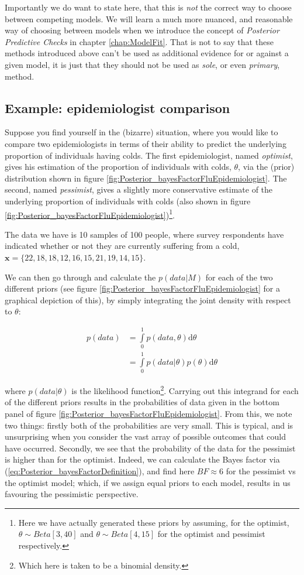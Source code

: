\documentclass[11pt,fullpage]{book}
\begin{document}
Importantly we do want to state here, that this is \textit{not} the correct way to choose between competing models. We will learn a much more nuanced, and reasonable way of choosing between models when we introduce the concept of \textit{Posterior Predictive Checks} in chapter \ref{chap:ModelFit}. That is not to say that these methods introduced above can't be used as additional evidence for or against a given model, it is just that they should not be used as \textit{sole}, or even \textit{primary}, method.

\subsection{Example: epidemiologist comparison}
Suppose you find yourself in the (bizarre) situation, where you would like to compare two epidemiologists in terms of their ability to predict the underlying proportion of individuals having colds. The first epidemiologist, named \textit{optimist}, gives his estimation of the proportion of individuals with colds, $\theta$, via the (prior) distribution shown in figure \ref{fig:Posterior_bayesFactorFluEpidemiologist}. The second, named \textit{pessimist}, gives a slightly more conservative estimate of the underlying proportion of individuals with colds (also shown in figure \ref{fig:Posterior_bayesFactorFluEpidemiologist})\footnote{Here we have actually generated these priors by assuming, for the optimist, $\theta\sim Beta[3,40]$ and $\theta\sim Beta[4,15]$ for the optimist and pessimist respectively.}.

The data we have is 10 samples of 100 people, where survey respondents have indicated whether or not they are currently suffering from a cold, $\boldsymbol{x} = \{22, 18, 18, 12, 16, 15, 21, 19, 14, 15\}$. 

We can then go through and calculate the $p(data|M)$ for each of the two different priors (see figure \ref{fig:Posterior_bayesFactorFluEpidemiologist} for a graphical depiction of this), by simply integrating the joint density with respect to $\theta$:

\begin{align}
p(data) &= \int\limits_{0}^{1} p(data,\theta) \mathrm{d}\theta\\
&= \int\limits_{0}^{1} p(data|\theta) p(\theta) \mathrm{d}\theta
\end{align}

where $p(data|\theta)$ is the likelihood function\footnote{Which here is taken to be a binomial density.}. Carrying out this integrand for each of the different priors results in the probabilities of data given in the bottom panel of figure \ref{fig:Posterior_bayesFactorFluEpidemiologist}. From this, we note two things: firstly both of the probabilities are very small. This is typical, and is unsurprising when you consider the vast array of possible outcomes that could have occurred. Secondly, we see that the probability of the data for the pessimist is higher than for the optimist. Indeed, we can calculate the Bayes factor via (\ref{eq:Posterior_bayesFactorDefinition}), and find here $BF \approx 6$ for the pessimist vs the optimist model; which, if we assign equal priors to each model, results in us favouring the pessimistic perspective.
\end{document}
